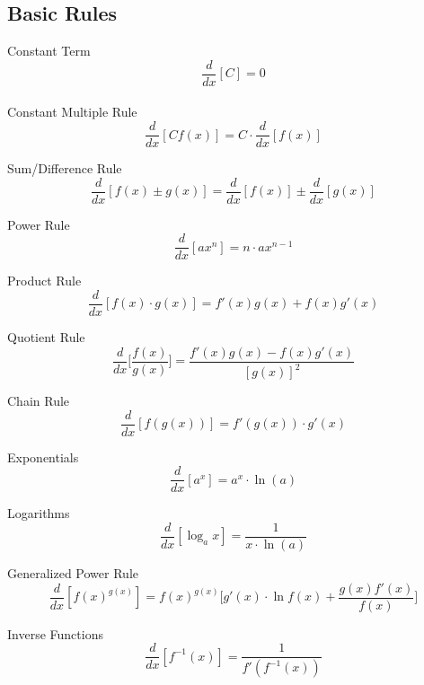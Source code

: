 \documentclass[12pt]{article}
\numberwithin{equation}{subsection}
\newcommand{\lnp}[1]{\ln\left( #1 \right)}
\begin{document}
\subsection{Basic Rules}
\begin{flushleft}
Constant Term
\begin{equation}
\frac{d}{dx}[C]=0
\end{equation}\\

Constant Multiple Rule
\begin{equation}
\frac{d}{dx}[Cf(x)]=C \cdot \frac{d}{dx}[f(x)]
\end{equation}

Sum/Difference Rule
\begin{equation}
\frac{d}{dx}[f(x)\pm g(x)]=\frac{d}{dx}[f(x)] \pm \frac{d}{dx}[g(x)]
\end{equation}

Power Rule
\begin{equation}
\frac{d}{dx}[ax^{n}]=n\cdot ax^{n-1}
\end{equation}

Product Rule
\begin{equation}
\frac{d}{dx}[f(x) \cdot g(x)]= f'(x)g(x)+f(x)g'(x)
\end{equation}

Quotient Rule
\begin{equation}
\frac{d}{dx}\biggl[ \frac{f(x)}{g(x)} \biggr]=\frac{f'(x)g(x)-f(x)g'(x)}{[g(x)]^{2}}
\end{equation}

Chain Rule
\begin{equation}
\frac{d}{dx}[f(g(x))]=f'(g(x)) \cdot g'(x)
\end{equation}

Exponentials
\begin{equation}
\frac{d}{dx}[a^{x}]=a^{x}\cdot \lnp{a}
\end{equation}

Logarithms
\begin{equation}
\frac{d}{dx}[\log_{a}{x}]=\frac{1}{x \cdot \lnp{a}}
\end{equation}

Generalized Power Rule
\begin{equation}
\frac{d}{dx}[f(x)^{g(x)}]=f(x)^{g(x)}\biggl[g'(x)\cdot\ln{f(x)}+\frac{g(x)f'(x)}{f(x)}\biggr]
\end{equation}

Inverse Functions
\begin{equation}
\frac{d}{dx}[f^{-1}(x)]= \frac{1}{f'(f^{-1}(x))}
\end{equation}


\end{flushleft}
\end{document}
